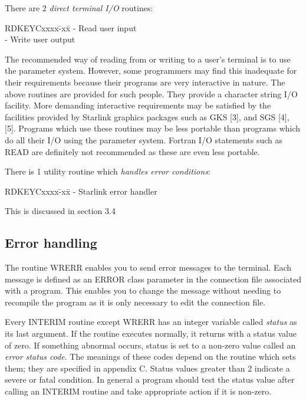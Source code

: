 There are 2 {\em direct terminal I/O} routines:
\begin{tabbing}
\hspace{40mm}RDKEYCxxxx\=-xx\=\kill
\hspace{40mm}{\bf RDUSER} \>- \>Read user input\\
\hspace{40mm}{\bf WRUSER} \>- \>Write user output
\end{tabbing}
The recommended way of reading from or writing to  a user's terminal is to use
the parameter system.
However, some programmers may find this inadequate for their requirements
because their programs are very interactive in nature.
The above routines are provided for such people.
They provide a character string I/O facility.
More demanding interactive requirements may be satisfied by the facilities
provided by Starlink graphics packages such as GKS [3], and SGS [4], [5].
Programs which use these routines may be less portable than programs which
do all their I/O using the parameter system.
Fortran I/O statements such as READ are definitely not recommended as these
are even less portable.

There is 1 utility routine which {\em handles error conditions}:
\begin{tabbing}
\hspace{40mm}RDKEYCxxxx\=-xx\=\kill
\hspace{40mm}{\bf STLERR} \>- \>Starlink error handler
\end{tabbing}
This is discussed in section 3.4
\subsection {Error handling}
The routine WRERR enables you to send error messages to the terminal.
Each message is defined as an ERROR class parameter in the connection file
associated with a program.
This enables you to change the message without needing to recompile
the program as it is only necessary to edit the connection file.

Every INTERIM routine except WRERR has an integer variable called {\em status}
as its last argument.
If the routine executes normally, it returns with a status value of zero.
If something abnormal occurs, status is set to a non-zero value called an
{\em error status code}.
The meanings of these codes depend on the routine which sets them; they are
specified in appendix C.
Status values greater than 2 indicate a severe or fatal condition.
In general a program should test the status value after calling an INTERIM
routine and take appropriate action if it is non-zero.

